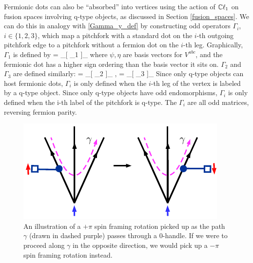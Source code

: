 Fermionic dots can also be ``absorbed'' into vertices using the action of $\mathbb{C}\ell_1$ on 
fusion spaces involving q-type objects, as discussed in Section \eqref{fusion_spaces}. 
We can do this in analogy with \eqref{Gamma_y_def} by constructing odd operators $\Gamma_i$, $i\in \{1,2,3\}$, which map a pitchfork with a standard dot 
on the $i$-th outgoing pitchfork edge to a pitchfork without a fermion dot on the $i$-th leg. 
Graphically, $\Gamma_1$ is defined by 
\be \label{gamma1_defn}
\underset{\psi}{\Pitchforkdotone} = \sum_{\eta}[ \Gamma_1 ]_{\psi \eta} \underset{\eta}{\PitchforkLarge}
\ee
where $\psi,\eta$ are basis vectors for $V^{abc}$, and the fermionic dot has a higher sign ordering than the basis vector it sits on.
$\Gamma_2$ and $\Gamma_3$ are defined similarly:
\be \label{gamma2gamma3_defn}
\underset{\psi}{\Pitchforkdottwo} = \sum_{\eta}[ \Gamma_2 ]_{\psi \eta} \underset{\eta}{\PitchforkLarge}, \quad \quad
\underset{\psi}{\Pitchforkdotthree} = \sum_{\eta}[ \Gamma_3 ]_{\psi \eta} \underset{\eta}{\PitchforkLarge}
\ee
Since only q-type objects can host fermionic dots, $\Gamma_i$ is only defined when the $i$-th 
leg of the vertex is labeled by a q-type object. 
Since only q-type objects have odd endomorphisms, 
$\Gamma_i$ is only defined when the i-{th} label of the pitchfork is q-type.
The $\Gamma_i$ are all odd matrices, reversing fermion parity.






\medskip

\begin{figure}
\begin{center}
\includegraphics{spin_rot_through_0handle.pdf}
\caption{ \label{spin_rot_through_0handle} An illustration of a $+\pi$ spin framing rotation picked up as the path $\gamma$ (drawn in dashed purple) passes through a 0-handle. 
If we were to proceed along $\gamma$ in the opposite direction, we would pick up a $-\pi$ spin framing rotation instead.   }
\end{center}
\end{figure}

